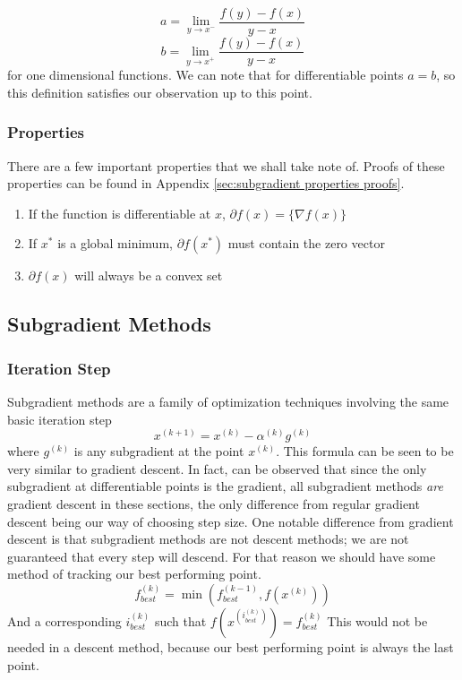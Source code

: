 \documentclass[conference]{IEEEtran}
\begin{document}
\begin{equation}\label{eq:subdifferential a def}
a = \lim_{y \rightarrow x^-} \frac{f(y)-f(x)}{y-x}
\end{equation}
\begin{equation}\label{eq:subdifferential b def}
b = \lim_{y \rightarrow x^+} \frac{f(y)-f(x)}{y-x}
\end{equation}
for one dimensional functions. We can note that for differentiable points \(a = b\), so this definition satisfies our observation up to this point.

\subsubsection{Properties}
There are a few important properties that we shall take note of. Proofs of these properties can be found in Appendix \ref{sec:subgradient properties proofs}.
\begin{enumerate}
    \item If the function is differentiable at \(x\), \(\partial f(x) = \{\nabla f(x)\}\)
    \item If \(x^*\) is a global minimum, \(\partial f(x^*)\) must contain the zero vector
    \item \(\partial f(x)\) will always be a convex set
\end{enumerate}

\subsection{Subgradient Methods}
\subsubsection{Iteration Step}
Subgradient methods are a family of optimization techniques involving the same basic iteration step
\begin{equation}\label{eq: subgradient method iteration}
x^{(k+1)} = x^{(k)} - \alpha^{(k)}g^{(k)}
\end{equation}
where \(g^{(k)}\) is any subgradient at the point \(x^{(k)}\). This formula can be seen to be very similar to gradient descent. In fact, can be observed that since the only subgradient at differentiable points is the gradient, all subgradient methods \textit{are} gradient descent in these sections, the only difference from regular gradient descent being our way of choosing step size. One notable difference from gradient descent is that subgradient methods are not descent methods; we are not guaranteed that every step will descend. For that reason we should have some method of tracking our best performing point.
\begin{equation}\label{eq:track best}
f^{(k)}_{best} = \min (f^{(k-1)}_{best}, f(x^{(k)}))
\end{equation}
And a corresponding \(i^{(k)}_{best}\) such that \(f(x^{(i^{(k)}_{best})}) = f^{(k)}_{best}\)
This would not be needed in a descent method, because our best performing point is always the last point.
\end{document}
